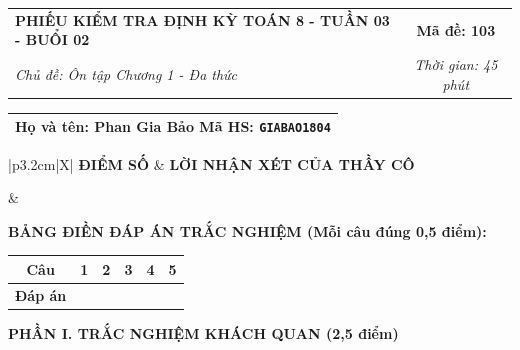 \documentclass[12pt,a4paper]{article}
\begin{document}
\newpage


\noindent
\begin{tabularx}{\linewidth}{|X|c|}
\hline
\textbf{PHIẾU KIỂM TRA ĐỊNH KỲ TOÁN 8 - TUẦN 03 - BUỔI 02} & \textbf{Mã đề: 103} \\
\textit{Chủ đề: Ôn tập Chương 1 - Đa thức} & \textit{Thời gian: 45 phút} \\
\hline
\end{tabularx}

\vspace{1mm}

\noindent
\begin{tabularx}{\linewidth}{|X|}
\hline
\rule[-2mm]{0pt}{7.5mm}\textbf{Họ và tên:} \textbf{\large Phan Gia Bảo} \hfill \textbf{Mã HS:} \texttt{GIABAO1804} \quad \\
\hline
\end{tabularx}

\vspace{1mm}

\noindent
\begin{tabularx}{\linewidth}{|p{3.2cm}|X|}
\hline
\centering\textbf{ĐIỂM SỐ} & \centering\textbf{LỜI NHẬN XÉT CỦA THẦY CÔ} \tabularnewline
\hline
\rule{0pt}{1.3cm} & \tabularnewline
\hline
\end{tabularx}

\vspace{1.2mm}

\noindent\textbf{BẢNG ĐIỀN ĐÁP ÁN TRẮC NGHIỆM (Mỗi câu đúng 0,5 điểm):}
\vspace{0.8mm}

\noindent
\renewcommand{\arraystretch}{1.35}
\begin{tabularx}{\linewidth}{|c|*{5}{>{\centering\arraybackslash}X|}}
\hline
\textbf{Câu} & \textbf{1} & \textbf{2} & \textbf{3} & \textbf{4} & \textbf{5} \\
\hline
\textbf{Đáp án} & & & & & \\
\hline
\end{tabularx}
\renewcommand{\arraystretch}{1.0}

\vspace{1.5mm}

\noindent\textbf{\large PHẦN I. TRẮC NGHIỆM KHÁCH QUAN (2,5 điểm)}
\vspace{1mm}
\end{document}
